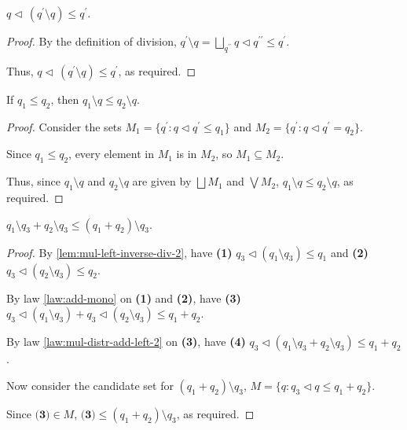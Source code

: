 \documentclass[acmsmall,screen,nonacm]{acmart}
\DeclareMathOperator{\scale}{\mathbin{\triangleleft}}
\begin{document}
\begin{lemma}
\label{lem:mul-left-inverse-div-2}
  $q \scale \, (q^\prime \setminus q) \le q^\prime$.
\end{lemma}

\begin{proof}
  By the definition of division, $q^\prime \setminus q = \bigsqcup\limits_{q^{\prime\prime}} q \scale q^{\prime\prime} \le q^\prime$.

  Thus, $q \scale \, (q^\prime \setminus q) \le q^\prime$, as required.
  
\end{proof}

\begin{lemma}
\label{lem:div-mono}
  If $q_1 \le q_2$, then $q_1 \setminus q \le q_2 \setminus q$.
\end{lemma}

\begin{proof}
  Consider the sets $M_1 = \{q^\prime : q \scale q^\prime \le q_1\}$ and $M_2 = \{q^\prime : q \scale q^\prime = q_2\}$.

  Since $q_1 \le q_2$, every element in $M_1$ is in $M_2$, so $M_1 \subseteq M_2$.
  
  Thus, since $q_1 \setminus q$ and $q_2 \setminus q$ are given by $\bigsqcup M_1$ and $\bigvee M_2$, $q_1 \setminus q \le q_2 \setminus q$, as required.
  
\end{proof}

\begin{lemma}
\label{lem:div-distr-add}
  $q_1 \setminus q_3 + q_2 \setminus q_3 \le (q_1 + q_2) \setminus q_3$.
\end{lemma}

\begin{proof}
  By \ref{lem:mul-left-inverse-div-2}, have \textbf{(1)} $q_3 \scale (q_1 \setminus q_3) \le q_1$ and \textbf{(2)} $q_3 \scale (q_2 \setminus q_3) \le q_2$.

  By law \ref{law:add-mono} on \textbf{(1)} and \textbf{(2)}, have \textbf{(3)} $q_3 \scale (q_1 \setminus q_3) + q_3 \scale (q_2 \setminus q_3) \le q_1 + q_2$.

  By law \ref{law:mul-distr-add-left-2} on \textbf{(3)}, have \textbf{(4)} $q_3 \scale (q_1 \setminus q_3 + q_2 \setminus q_3) \le q_1 + q_2$.

  Now consider the candidate set for $(q_1 + q_2) \setminus q_3$, $M = \{q : q_3 \scale q \le q_1 + q_2\}$.

  Since $\textbf{(3)} \in M$, $\textbf{(3)} \le (q_1 + q_2) \setminus q_3$, as required.
  
\end{proof}
\end{document}
